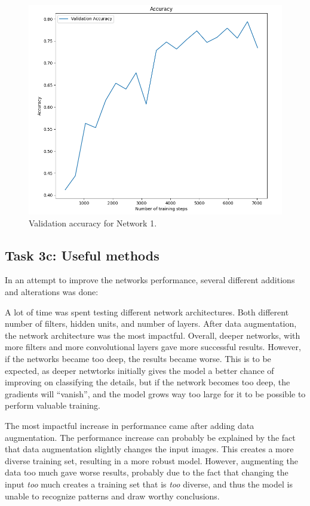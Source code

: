 \documentclass{article}
\begin{document}
\begin{figure}[H]
    \centering
    \includegraphics[width =\textwidth]{Assignments/Assignment_3/plots/task3best_plot_accuracy.png}
    \caption{Validation accuracy for Network 1.}
    \label{fig:task3bbest_acc}
\end{figure}

\subsection{Task 3c: Useful methods}

In an attempt to improve the networks performance, several different additions and alterations was done:

A lot of time was spent testing different network architectures. Both different number of filters, hidden units, and number of layers. After data augmentation, the network architecture was the most impactful. Overall, deeper networks, with more filters and more convolutional layers gave more successful results. However, if the networks became too deep, the results became worse. This is to be expected, as deeper netwtorks initially gives the model a better chance of improving on classifying the details, but if the network becomes too deep, the gradients will ``vanish'', and the model grows way too large for it to be possible to perform valuable training.  


The most impactful increase in performance came after adding data augmentation. The performance increase can probably be explained by the fact that data augmentation slightly changes the input images. This creates a more diverse training set, resulting in a more robust model. However, augmenting the data too much gave worse results, probably due to the fact that changing the input \textit{too} much creates a training set that is \textit{too} diverse, and thus the model is unable to recognize patterns and draw worthy conclusions. 
\end{document}
